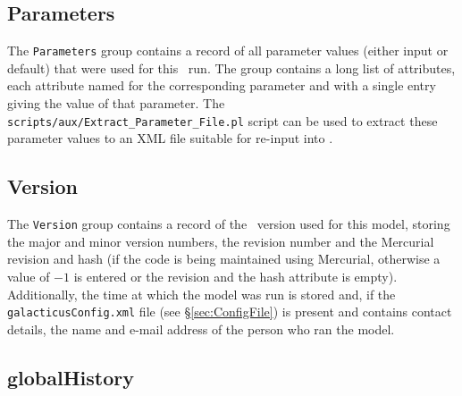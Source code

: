 \subsection{Parameters}

The {\tt Parameters} group contains a record of all parameter values (either input or default) that were used for this \glc\ run. The group contains a long list of attributes, each attribute named for the corresponding parameter and with a single entry giving the value of that parameter. The {\tt scripts/aux/Extract\_Parameter\_File.pl} script can be used to extract these parameter values to an XML file suitable for re-input into \glc.

\subsection{Version}

The {\tt Version} group contains a record of the \glc\ version used for this model, storing the major and minor version numbers, the revision number and the {\sc Mercurial} revision and hash (if the code is being maintained using {\sc Mercurial}, otherwise a value of $-1$ is entered or the revision and the hash attribute is empty). Additionally, the time at which the model was run is stored and, if the {\tt galacticusConfig.xml} file (see \S\ref{sec:ConfigFile}) is present and contains contact details, the name and e-mail address of the person who ran the model.

\subsection{globalHistory}\label{sec:globalHistory}

